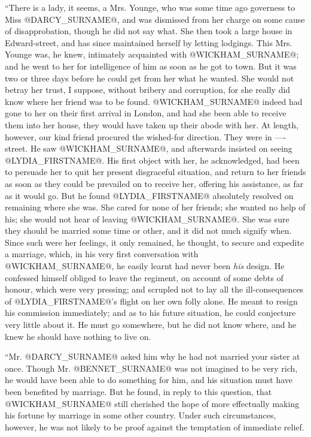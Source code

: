 ``There is a lady, it seems, a Mrs. Younge, who was some time ago
governess to Miss @DARCY_SURNAME@, and was dismissed from her charge on some cause
of disapprobation, though he did not say what. She then took a large
house in Edward-street, and has since maintained herself by letting
lodgings. This Mrs. Younge was, he knew, intimately acquainted with
@WICKHAM_SURNAME@; and he went to her for intelligence of him as soon as he got to
town. But it was two or three days before he could get from her what he
wanted. She would not betray her trust, I suppose, without bribery and
corruption, for she really did know where her friend was to be found.
@WICKHAM_SURNAME@ indeed had gone to her on their first arrival in London, and had
she been able to receive them into her house, they would have taken up
their abode with her. At length, however, our kind friend procured the
wished-for direction. They were in ---- street. He saw @WICKHAM_SURNAME@, and
afterwards insisted on seeing @LYDIA_FIRSTNAME@. His first object with her, he
acknowledged, had been to persuade her to quit her present disgraceful
situation, and return to her friends as soon as they could be prevailed
on to receive her, offering his assistance, as far as it would go. But
he found @LYDIA_FIRSTNAME@ absolutely resolved on remaining where she was. She cared
for none of her friends; she wanted no help of his; she would not hear
of leaving @WICKHAM_SURNAME@. She was sure they should be married some time or
other, and it did not much signify when. Since such were her feelings,
it only remained, he thought, to secure and expedite a marriage, which,
in his very first conversation with @WICKHAM_SURNAME@, he easily learnt had never
been \textit{his} design. He confessed himself obliged to leave the regiment,
on account of some debts of honour, which were very pressing; and
scrupled not to lay all the ill-consequences of @LYDIA_FIRSTNAME@'s flight on her
own folly alone. He meant to resign his commission immediately; and as
to his future situation, he could conjecture very little about it. He
must go somewhere, but he did not know where, and he knew he should have
nothing to live on.

``Mr. @DARCY_SURNAME@ asked him why he had not married your sister at once. Though
Mr. @BENNET_SURNAME@ was not imagined to be very rich, he would have been able
to do something for him, and his situation must have been benefited by
marriage. But he found, in reply to this question, that @WICKHAM_SURNAME@ still
cherished the hope of more effectually making his fortune by marriage in
some other country. Under such circumstances, however, he was not likely
to be proof against the temptation of immediate relief.

